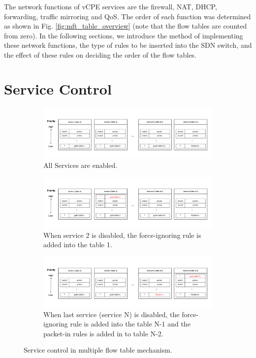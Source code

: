 The network functions of vCPE services are the firewall, NAT, DHCP, forwarding, traffic mirroring and QoS.
The order of each function was determined as shown in Fig. \ref{fig:mft_table_overview} (note that the flow tables are counted from zero).
In the following sections, we introduce the method of implementing these network functions, the type of rules to be inserted into the SDN switch, and the effect of these rules on deciding the order of the flow tables.



\section{Service Control} \label{sec:service_control}

\begin{figure}[!tp]
  \begin{subfigure}[b]{\textwidth}
    \includegraphics[width=\textwidth]{./fig/service_control1.pdf}
    \caption{All Services are enabled.}
    \label{fig:service_control_all_enable}
  \end{subfigure}
  \hfill
  \begin{subfigure}[b]{\textwidth}
    \includegraphics[width=\textwidth]{./fig/service_control2.pdf}
    \caption{When service 2 is disabled, the force-ignoring rule is added into the table 1.}
    \label{fig:service_control_disable2}
  \end{subfigure}
  \hfill
  \begin{subfigure}[b]{\textwidth}
    \includegraphics[width=\textwidth]{./fig/service_control3.pdf}
    \caption{When last service (service N) is disabled, the force-ignoring rule is added into the table N-1 and the packet-in rules is added in to table N-2.}
    \label{fig:service_control_last}
  \end{subfigure}
  \caption{Service control in multiple flow table mechanism.}
\end{figure}


